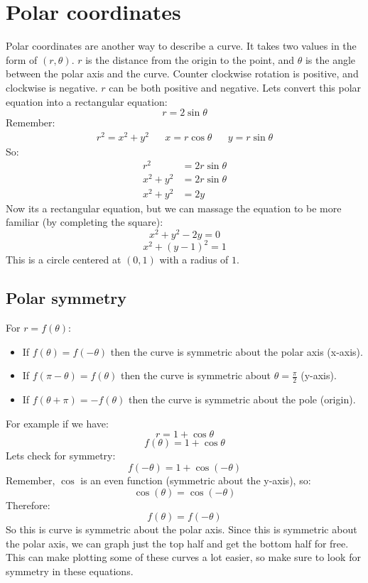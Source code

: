 \documentclass{report}
\begin{document}
\section{Polar coordinates}
    Polar coordinates are another way to describe a curve. It takes two values in the form of \((r, \theta)\).
    \(r\) is the distance from the origin to the point, and \(\theta\) is the angle between the polar axis and the curve.
    Counter clockwise rotation is positive, and clockwise is negative.
    \(r\) can be both positive and negative.
    Lets convert this polar equation into a rectangular equation:
    \[r = 2 \sin \theta\]
    Remember:
    \begin{align*}
        r^2 = x^2 + y^2 &&
        x = r \cos \theta &&
        y = r \sin \theta
    \end{align*}
    So:
    \begin{align*}
        r^2 &= 2r \sin \theta \\
        x^2 + y^2 &= 2r \sin \theta \\
        x^2 + y^2 &= 2y
    \end{align*}
    Now its a rectangular equation, but we can massage the equation to be more familiar (by completing the square):
    \[x^2 + y^2 - 2y = 0\]
    \[x^2 + (y-1)^2 = 1\]
    This is a circle centered at \((0, 1)\) with a radius of \(1\).
    
    \subsection{Polar symmetry}
        For \(r = f(\theta)\):
        \begin{itemize}
            \item If \(f(\theta) = f(- \theta)\) then the curve is symmetric about the polar axis (x-axis).
            \item If \(f(\pi - \theta) = f(\theta)\) then the curve is symmetric about \(\theta = \frac{\pi}{2}\) (y-axis).
            \item If \(f(\theta + \pi) = - f(\theta)\) then the curve is symmetric about the pole (origin).
        \end{itemize}
        For example if we have:
        \[r = 1 + \cos \theta\]
        \[f(\theta) = 1 + \cos \theta\]
        Lets check for symmetry:
        \[f(- \theta) = 1 + \cos (- \theta)\]
        Remember, \(\cos\) is an even function (symmetric about the y-axis), so:
        \[\cos (\theta) = \cos (- \theta)\]
        Therefore:
        \[f(\theta) = f(-\theta)\]
        So this is curve is symmetric about the polar axis.
        Since this is symmetric about the polar axis, we can graph just the top half and get the bottom half for free.
        This can make plotting some of these curves a lot easier, so make sure to look for symmetry in these equations.
    
\end{document}
